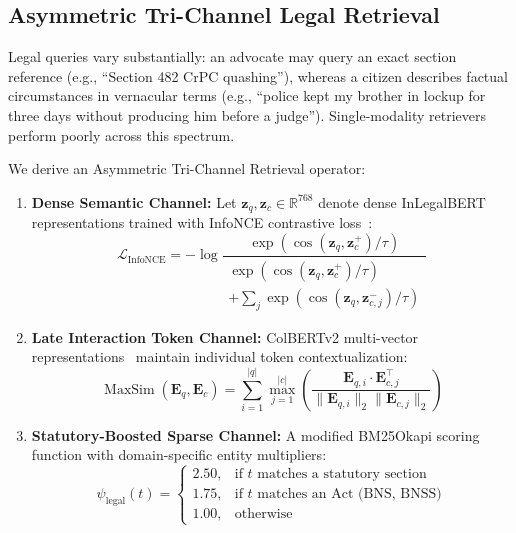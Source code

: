 \documentclass[conference]{IEEEtran}
\begin{document}
\subsection{Asymmetric Tri-Channel Legal Retrieval}
Legal queries vary substantially: an advocate may query an exact section reference (e.g., ``Section 482 CrPC quashing''), whereas a citizen describes factual circumstances in vernacular terms (e.g., ``police kept my brother in lockup for three days without producing him before a judge''). Single-modality retrievers perform poorly across this spectrum.

We derive an Asymmetric Tri-Channel Retrieval operator:
\begin{enumerate}
    \item \textbf{Dense Semantic Channel:} Let $\mathbf{z}_q, \mathbf{z}_c \in \mathbb{R}^{768}$ denote dense InLegalBERT representations trained with InfoNCE contrastive loss~\cite{oord2018infonce}:
    \begin{equation}
    \mathcal{L}_{\text{InfoNCE}} = -\log \frac{\exp(\cos(\mathbf{z}_q, \mathbf{z}_c^+) / \tau)}{\substack{\exp(\cos(\mathbf{z}_q, \mathbf{z}_c^+) / \tau) \\ + \sum_{j} \exp(\cos(\mathbf{z}_q, \mathbf{z}_{c, j}^-) / \tau)}}
    \end{equation}
    \item \textbf{Late Interaction Token Channel:} ColBERTv2 multi-vector representations~\cite{santhanam2022colbertv2} maintain individual token contextualization:
    \begin{equation}
    \operatorname{MaxSim}(\mathbf{E}_q, \mathbf{E}_c) = \sum_{i=1}^{|q|} \max_{j=1}^{|c|} \left( \frac{\mathbf{E}_{q, i} \cdot \mathbf{E}_{c, j}^\top}{\|\mathbf{E}_{q, i}\|_2 \|\mathbf{E}_{c, j}\|_2} \right)
    \end{equation}
    \item \textbf{Statutory-Boosted Sparse Channel:} A modified BM25Okapi scoring function with domain-specific entity multipliers:
    \begin{equation}
    \psi_{\text{legal}}(t) = \begin{cases}
    2.50, & \text{if } t \text{ matches a statutory section} \\
    1.75, & \text{if } t \text{ matches an Act (BNS, BNSS)} \\
    1.00, & \text{otherwise}
    \end{cases}
    \end{equation}
\end{enumerate}
\end{document}
